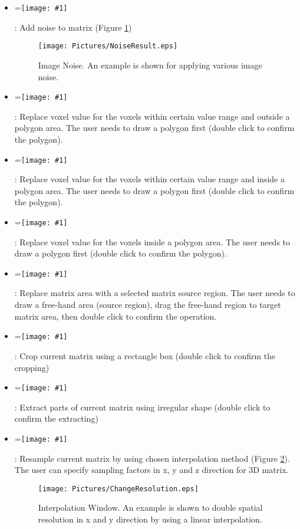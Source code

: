\documentclass{article}%
\newcommand{\vcenteredinclude}[1]{
\begingroup
\setbox0=\hbox{\texttt{[image: \#1]}}
\parbox{\wd0}{\box0}\endgroup}
\begin{document}
\begin{enumerate}
\begin{itemize}
		
		\item \vcenteredinclude{Pictures/Noise.eps} : Add noise to matrix (Figure \ref{fig:NoiseResult})
		
	\begin{figure}[htbp]
		\centering
			\texttt{[image: Pictures/NoiseResult.eps]}
		\caption{Image Noise. An example is shown for applying various image noise.}
		\label{fig:NoiseResult}
	\end{figure}
		
		
		\item \vcenteredinclude{Pictures/FillOut.eps} : Replace voxel value for the voxels within certain value range and outside a polygon area. The user needs to draw a polygon first (double click to confirm the polygon).
		\item \vcenteredinclude{Pictures/FillIn.eps} : Replace voxel value for the voxels within certain value range and inside a polygon area. The user needs to draw a polygon first (double click to confirm the polygon).
		\item \vcenteredinclude{Pictures/Fill.eps} : Replace voxel value for the voxels inside a polygon area. The user needs to draw a polygon first (double click to confirm the polygon).
		\item \vcenteredinclude{Pictures/Replace.eps} : Replace matrix area with a selected matrix source region. The user needs to draw a free-hand area (source region), drag the free-hand region to target matrix area, then double click to confirm the operation.
		\item \vcenteredinclude{Pictures/Crop.eps} : Crop current matrix using a rectangle box (double click to confirm the cropping)
		\item \vcenteredinclude{Pictures/Extract.eps} : Extract parts of current matrix using irregular shape (double click to confirm the extracting)
		\item \vcenteredinclude{Pictures/Resolution.eps} : Resample current matrix by using chosen interpolation method (Figure \ref{fig:ChangeResolution}). The user can specify sampling factors in x, y and z direction for 3D matrix.
		
	\begin{figure}[htbp]
		\centering
			\texttt{[image: Pictures/ChangeResolution.eps]}
		\caption{Interpolation Window. An example is shown to double spatial resolution in x and y direction by using a linear interpolation.}
		\label{fig:ChangeResolution}
	\end{figure}
		

\end{itemize}
\end{enumerate}
\end{document}
